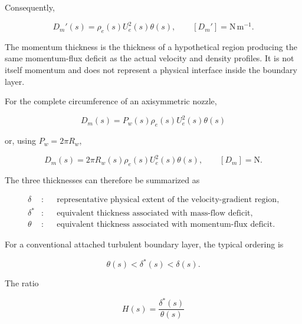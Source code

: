 Consequently,

\begin{equation}
    \boxed{
    D_m'(s)
    =
    \rho_e(s)U_e^2(s)\theta(s)
    },
    \qquad
    [D_m']=\mathrm{N\,m^{-1}}.
    \label{eq:momentum_deficit_per_perimeter}
\end{equation}

The momentum thickness is the thickness of a hypothetical region producing
the same momentum-flux deficit as the actual velocity and density profiles. It
is not itself momentum and does not represent a physical interface inside the
boundary layer.

For the complete circumference of an axisymmetric nozzle,

\begin{equation}
    \boxed{
    D_m(s)
    =
    P_w(s)\rho_e(s)U_e^2(s)\theta(s)
    }
    \label{eq:axisymmetric_momentum_deficit}
\end{equation}

or, using \(P_w=2\pi R_w\),

\begin{equation}
    \boxed{
    D_m(s)
    =
    2\pi R_w(s)\rho_e(s)U_e^2(s)\theta(s)
    },
    \qquad
    [D_m]=\mathrm{N}.
    \label{eq:axisymmetric_momentum_deficit_radius}
\end{equation}

The three thicknesses can therefore be summarized as

\begin{align}
    \delta
    &:
    &&\text{representative physical extent of the velocity-gradient region},
    \\
    \delta^*
    &:
    &&\text{equivalent thickness associated with mass-flow deficit},
    \\
    \theta
    &:
    &&\text{equivalent thickness associated with momentum-flux deficit}.
\end{align}

For a conventional attached turbulent boundary layer, the typical ordering is

\begin{equation}
    \boxed{
    \theta(s)<\delta^*(s)<\delta(s)
    }.
    \label{eq:BL_thickness_ordering}
\end{equation}

The ratio

\begin{equation}
    \boxed{
    H(s)
    =
    \frac{\delta^*(s)}{\theta(s)}
    }
    \label{eq:shape_factor}
\end{equation}

